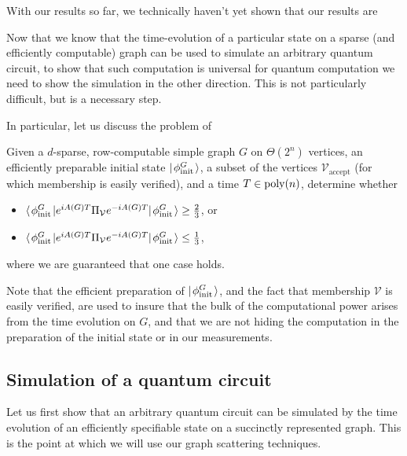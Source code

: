 \documentclass[../thesis-main/thesis-main]{subfiles}
\begin{document}
With our results so far, we technically haven't yet shown that our results are 

Now that we know that the time-evolution of a particular state on a sparse (and efficiently computable) graph can be used to simulate an arbitrary quantum circuit, to show that such computation is universal for quantum computation we need to show the simulation in the other direction.  This is not particularly difficult, but is a necessary step.

In particular, let us discuss the problem of
\begin{problem}[\QWE] Given a $d$-sparse, row-computable simple graph $G$ on $\Theta(2^n)$ vertices, an efficiently preparable initial state $|\mspace{2mu} \phi_{\text{init}}^G \mspace{2mu} \rangle$, a subset of the vertices $\mathcal{V}_{\text{accept}}$ (for which membership is easily verified), and a time $T \in \operatorname{poly}(n)$, determine whether
\begin{itemize}
   \item $\langle\mspace{2mu} \phi_{\text{init}}^G \mspace{2mu} | e^{i A(G) T} \Pi_{\mathcal{V}} e^{-i A(G)T} |\mspace{2mu} \phi_{\text{init}}^G \mspace{2mu} \rangle \geq \frac{2}{3}$, or
   \item $\langle\mspace{2mu} \phi_{\text{init}}^G \mspace{2mu} | e^{i A(G) T} \Pi_{\mathcal{V}} e^{-i A(G)T} |\mspace{2mu} \phi_{\text{init}}^G \mspace{2mu} \rangle \leq \frac{1}{3}$,
\end{itemize}
where we are guaranteed that one case holds.
\end{problem}

Note that the efficient preparation of $|\mspace{2mu} \phi_{\text{init}}^G \mspace{2mu} \rangle$, and the fact that membership $\mathcal{V}$ is easily verified, are used to insure that the bulk of the computational power arises from the time evolution on $G$, and that we are not hiding the computation in the preparation of the initial state or in our measurements.

\subsection{Simulation of a quantum circuit}

Let us first show that an arbitrary quantum circuit can be simulated by the time evolution of an efficiently specifiable state on a succinctly represented graph.  This is the point at which we will use our graph scattering techniques.  
\end{document}
